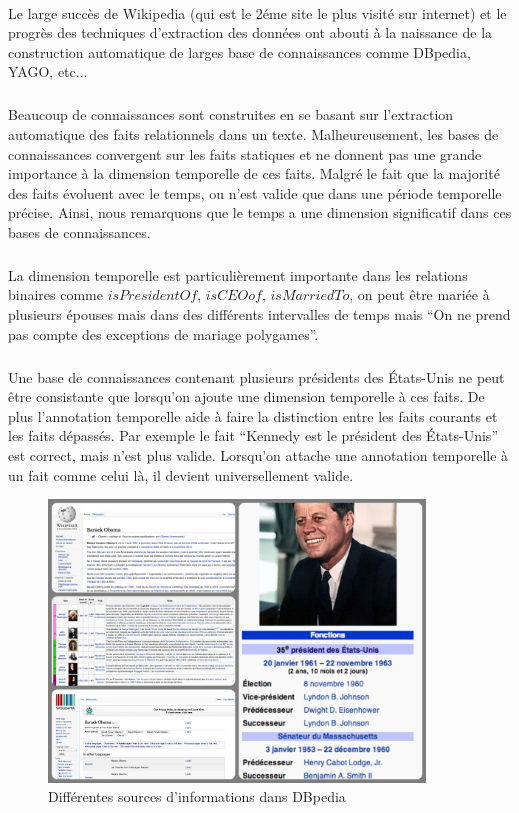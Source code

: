 \documentclass[12pt,a4	]{report}
\begin{document}
\paragraph{}
Le large succès de Wikipedia (qui est le 2éme site le plus visité sur internet) et le progrès des techniques d’extraction des données ont abouti à la naissance de la construction automatique  de larges base de connaissances comme DBpedia, YAGO, etc...
\subparagraph{}
Beaucoup de connaissances sont construites en se basant sur l’extraction automatique des faits relationnels dans un texte.
Malheureusement, les bases de connaissances convergent sur les faits statiques et ne donnent pas une grande importance à la dimension temporelle de ces faits.
Malgré le fait que la majorité des faits évoluent avec le temps, ou n'est valide que dans une période temporelle précise. Ainsi, nous remarquons que le temps a une dimension significatif dans ces bases de connaissances.
\subparagraph{}
La dimension temporelle est particulièrement importante dans les relations binaires comme $isPresidentOf$, $isCEOof$, $isMarriedTo$, on peut être mariée à plusieurs épouses mais dans des différents intervalles de temps mais ``On ne prend pas compte des exceptions de mariage polygames''.
\subparagraph{}
Une base de connaissances contenant plusieurs présidents des États-Unis ne peut être consistante que lorsqu’on ajoute une dimension temporelle à ces faits. De plus l’annotation temporelle aide à faire la distinction entre les faits courants et les faits dépassés.
Par exemple le fait ``Kennedy est le président des États-Unis'' est correct, mais n'est plus valide.
Lorsqu’on attache une annotation temporelle à un fait comme celui là, il devient universellement valide.
\begin{figure}[H]
\centering
\includegraphics[width=10cm]{Sources.png}
\caption{Différentes sources d'informations dans DBpedia}
\end{figure}
\end{document}
